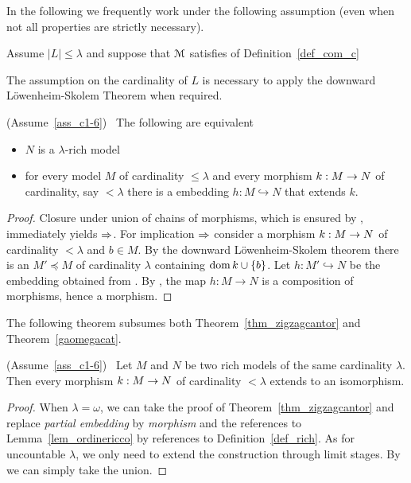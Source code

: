 In the following we frequently work under the following assumption (even when not all properties are strictly necessary).
 
\begin{assumption}\label{ass_c1-6}
Assume  $|L|\le\lambda$ and suppose that $\EuScript M$ satisfies  of Definition~\ref{def_com_c}
\end{assumption} 
 
The assumption on the cardinality of $L$ is necessary to apply the downward L\"owen\-heim-Skolem Theorem when required.

\begin{proposition}\label{prop_6.1}
(Assume~\ref{ass_c1-6})  \  The following are equivalent
\begin{itemize}
\item[1.] $N$ is a $\lambda$-rich model
\item[2.] for every model $M$ of cardinality $\le\lambda$ and every morphism $k:M\rightarrow N$ of cardinality, say $<\lambda$ there is a embedding $h:M\hookrightarrow N$ that extends $k$.
\end{itemize}
\end{proposition}

\begin{proof}
Closure under union of chains of morphisms, which is ensured by , immediately yields $\Rightarrow$.
For implication $\Rightarrow$ consider a morphism $k:M\rightarrow N$ of cardinality $<\lambda$ and $b\in M$.
By the downward L\"owenheim-Skolem theorem there is an  $M'\preceq M$ of cardinality $\lambda$ containing $\mathop{\rm dom} k \cup\{b\}$.
Let $h:M'\hookrightarrow N$ be the embedding obtained from .
By , the map $h:M\to N$ is a composition of morphisms, hence a morphism.
\end{proof}

The following theorem subsumes both Theorem~\ref{thm_zigzagcantor} and Theorem~\ref{gaomegacat}.

\begin{theorem}\label{thm_riccozigzag}
(Assume~\ref{ass_c1-6})  \  Let $M$ and $N$ be two rich models of the same cardinality $\lambda$.
Then every morphism $k:M\rightarrow N$ of cardinality $<\lambda$ extends to an isomorphism.
\end{theorem}

\begin{proof}
When $\lambda=\omega$, we can take the proof of Theorem~\ref{thm_zigzagcantor} and replace \textit{partial embedding\/} by \textit{morphism\/} and the references to Lemma~\ref{lem_ordinericco} by references to Definition~\ref{def_rich}.
As for uncountable $\lambda$, we only need to extend the construction through limit stages.
By  we can simply take the union.
\end{proof}

